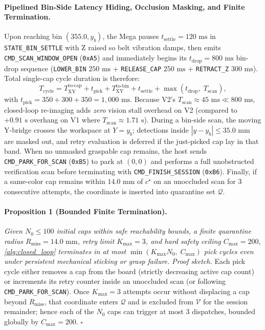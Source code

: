 \documentclass[10pt,twocolumn,letterpaper]{article}
\begin{document}
\paragraph{Pipelined Bin-Side Latency Hiding, Occlusion Masking, and Finite Termination.}
Upon reaching bin $(355.0, y_b)$, the Mega pauses $t_{\mathrm{settle}} = 120\text{ ms}$ in \texttt{STATE\_BIN\_SETTLE} with Z raised so belt vibration damps, then emits \texttt{CMD\_SCAN\_WINDOW\_OPEN} (\texttt{0xA5}) and immediately begins its $t_{\mathrm{drop}} = 800\text{ ms}$ bin-drop sequence (\texttt{LOWER\_BIN} $250\text{ ms}$ + \texttt{RELEASE\_CAP} $250\text{ ms}$ + \texttt{RETRACT\_Z} $300\text{ ms}$). Total single-cap cycle duration is therefore:
\begin{equation}
  T_{\mathrm{cycle}} = T_{\mathrm{XY}}^{\mathrm{to\text{-}cap}} + t_{\mathrm{pick}} + T_{\mathrm{XY}}^{\mathrm{to\text{-}bin}} + t_{\mathrm{settle}} + \max\!\left(t_{\mathrm{drop}},\; T_{\mathrm{scan}}\right),
  \label{eq:pipelined_cycle}
\end{equation}
with $t_{\mathrm{pick}} = 350 + 300 + 350 = 1{,}000\text{ ms}$. Because V2's $T_{\mathrm{scan}} \approx 45\text{ ms} \ll 800\text{ ms}$, closed-loop re-imaging adds \emph{zero} vision stall overhead on V2 (compared to $+0.91\text{ s}$ overhang on V1 where $T_{\mathrm{scan}} \approx 1.71\text{ s}$). During a bin-side scan, the moving Y-bridge crosses the workspace at $Y = y_b$; detections inside $|y - y_b| \le 35.0\text{ mm}$ are masked out, and retry evaluation is deferred if the just-picked cap lay in that band. When no unmasked graspable cap remains, the host sends \texttt{CMD\_PARK\_FOR\_SCAN} (\texttt{0xB5}) to park at $(0,0)$ and performs a full unobstructed verification scan before terminating with \texttt{CMD\_FINISH\_SESSION} (\texttt{0xB6}). Finally, if a same-color cap remains within $14.0\text{ mm}$ of $c^\star$ on an unoccluded scan for $3$ consecutive attempts, the coordinate is inserted into quarantine set $\mathcal{Q}$.

\paragraph{Proposition 1 (Bounded Finite Termination).}
\emph{Given $N_0 \le 100$ initial caps within safe reachability bounds, a finite quarantine radius $R_{\mathrm{miss}} = 14.0\text{ mm}$, retry limit $K_{\max} = 3$, and hard safety ceiling $C_{\max} = 200$, \cref{alg:closed_loop} terminates in at most $\min(K_{\max} N_0,\; C_{\max})$ pick cycles even under persistent mechanical sticking or grasp failure.}
\emph{Proof sketch.} Each pick cycle either removes a cap from the board (strictly decreasing active cap count) or increments its retry counter inside an unoccluded scan (or following \texttt{CMD\_PARK\_FOR\_SCAN}). Once $K_{\max}=3$ attempts occur without displacing a cap beyond $R_{\mathrm{miss}}$, that coordinate enters $\mathcal{Q}$ and is excluded from $\mathcal{V}$ for the session remainder; hence each of the $N_0$ caps can trigger at most $3$ dispatches, bounded globally by $C_{\max}=200$. $\square$
\end{document}
